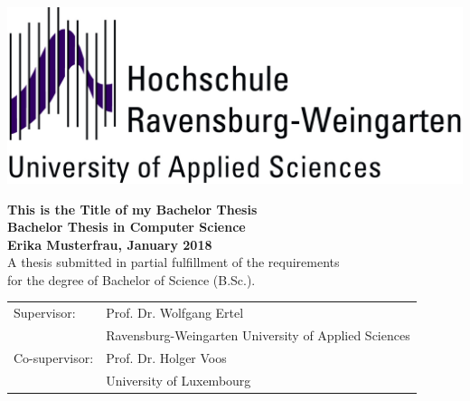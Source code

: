 \pagestyle{empty}
\begin{flushright}
\includegraphics[scale=0.5]{imgs/hswgt.jpg}
\end{flushright}

\begin{center}
\vspace*{5cm}

\huge
\textbf{This is the Title of my Bachelor Thesis}\\
\Large
\vspace*{2cm}
\noindent \textbf{Bachelor Thesis in Computer Science}\\
\vspace*{0.5cm}
\noindent \textbf{Erika Musterfrau, January 2018}\\
\vspace*{2cm}
\normalsize 
A thesis submitted in partial fulfillment of the requirements\\ for the degree
of Bachelor of Science (B.Sc.).

\end{center}

\vspace*{4.5cm}
\begin{tabular}{ll}
Supervisor: & Prof. Dr. Wolfgang Ertel \\
 & Ravensburg-Weingarten University of Applied Sciences\\
Co-supervisor: & Prof. Dr. Holger Voos\\
 & University of Luxembourg\\
\end{tabular}

